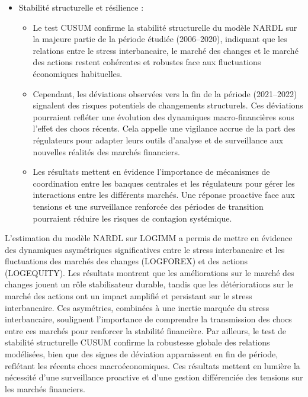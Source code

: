 \begin{itemize}
    \item Stabilité structurelle et résilience :
    \begin{itemize}
        \item Le test CUSUM confirme la stabilité structurelle du modèle NARDL sur la majeure partie de la période étudiée (2006–2020), indiquant que les relations entre le stress interbancaire, le marché des changes et le marché des actions restent cohérentes et robustes face aux fluctuations économiques habituelles.
        \item Cependant, les déviations observées vers la fin de la période (2021–2022) signalent des risques potentiels de changements structurels. Ces déviations pourraient refléter une évolution des dynamiques macro-financières sous l’effet des chocs récents. Cela appelle une vigilance accrue de la part des régulateurs pour adapter leurs outils d’analyse et de surveillance aux nouvelles réalités des marchés financiers.
        \item Les résultats mettent en évidence l’importance de mécanismes de coordination entre les banques centrales et les régulateurs pour gérer les interactions entre les différents marchés. Une réponse proactive face aux tensions et une surveillance renforcée des périodes de transition pourraient réduire les risques de contagion systémique.
    \end{itemize}
\end{itemize}

L'estimation du modèle NARDL sur LOGIMM a permis de mettre en évidence des dynamiques asymétriques significatives entre le stress interbancaire et les fluctuations des marchés des changes (LOGFOREX) et des actions (LOGEQUITY). Les résultats montrent que les améliorations sur le marché des changes jouent un rôle stabilisateur durable, tandis que les détériorations sur le marché des actions ont un impact amplifié et persistant sur le stress interbancaire. Ces asymétries, combinées à une inertie marquée du stress interbancaire, soulignent l'importance de comprendre la transmission des chocs entre ces marchés pour renforcer la stabilité financière. Par ailleurs, le test de stabilité structurelle CUSUM confirme la robustesse globale des relations modélisées, bien que des signes de déviation apparaissent en fin de période, reflétant les récents chocs macroéconomiques. Ces résultats mettent en lumière la nécessité d'une surveillance proactive et d'une gestion différenciée des tensions sur les marchés financiers.\\

